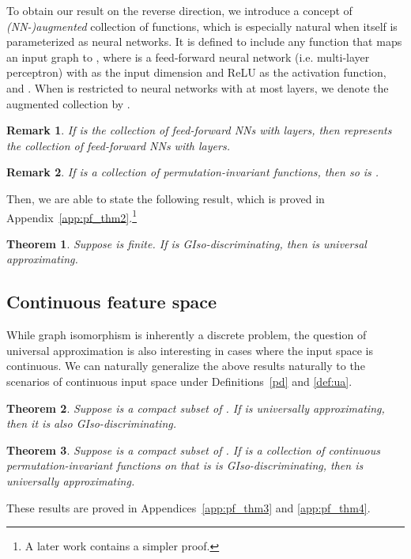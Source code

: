 \documentclass{article}
\newtheorem{theorem}{Theorem}
\newtheorem{remark}{Remark}
\begin{document}
To obtain our result on the reverse direction, we introduce a concept of \emph{(NN-)augmented} collection of functions, which is especially natural when  itself is parameterized as neural networks.
It is defined to include any function that maps an input graph  to , where  is a feed-forward neural network (i.e. multi-layer perceptron) with  as the input dimension and ReLU as the activation function, and . When  is restricted to neural networks with at most  layers, we denote the augmented collection by . 

\begin{remark}
If  is the collection of feed-forward NNs with  layers, then  represents the collection of feed-forward NNs with  layers.
\end{remark}

\begin{remark}
If  is a collection of permutation-invariant functions, then so is .
\end{remark}

Then, we are able to state the following result, which is proved in Appendix~\ref{app:pf_thm2}.\footnote{A later work \cite{chen2020can} contains a simpler proof.} 
\begin{theorem}
\label{PD2UAfin}
Suppose  is finite. If  is GIso-discriminating, then  is universal approximating.
\end{theorem}

\subsection{Continuous feature space}
While graph isomorphism is inherently a discrete problem, 
the question of universal approximation is also interesting in cases where the input space is continuous.
We can naturally generalize the above results naturally to the scenarios of continuous input space under Definitions~\ref{pd} and \ref{def:ua}. 

\begin{theorem}\label{ua2pdinf}
Suppose  is a compact subset of . If  is universally approximating, then it is also GIso-discriminating.
\end{theorem}

\begin{theorem}
\label{thm:4}
Suppose  is a compact subset of . If  is a collection of continuous permutation-invariant functions on  that is is GIso-discriminating, then  is universally approximating.
\end{theorem}
These results are proved in Appendices~\ref{app:pf_thm3} and \ref{app:pf_thm4}.
\end{document}
